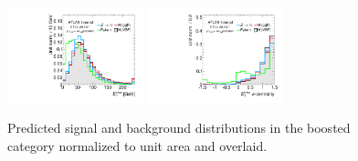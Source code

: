 \begin{figure}[tp]
  \includegraphics[width=0.35\textwidth]{figures/overlaid/boost/met-pt-hi}
  \includegraphics[width=0.35\textwidth]{figures/overlaid/boost/met-phi-centrality}
  \caption{Predicted signal and background distributions in the boosted category normalized to unit area and overlaid.}
  \label{fig:strategy-overlaid-boost-taus}
\end{figure}

